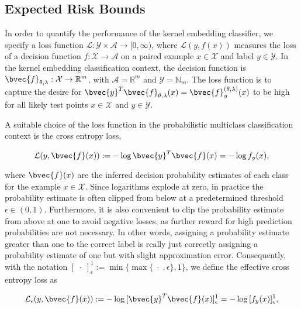 \documentclass{article}
\begin{document}
	\subsection{Expected Risk Bounds}
	\label{app:expected_risk_bounds}
	
		In order to quantify the performance of the kernel embedding classifier, we specify a loss function $\mathcal{L} : \mathcal{Y} \times \mathcal{A} \to [0, \infty)$, where $\mathcal{L}(y, f(x))$ measures the loss of a decision function $f : \mathcal{X} \to \mathcal{A}$ on a paired example $x \in \mathcal{X}$ and label $y \in \mathcal{Y}$. In the kernel embedding classification context, the decision function is $\bvec{f}_{\theta, \lambda} : \mathcal{X} \to \mathbb{R}^{m}$, with $\mathcal{A} = \mathbb{R}^{m}$ and $\mathcal{Y} = \mathbb{N}_{m}$. The loss function is to capture the desire for $\bvec{y}^{T} \bvec{f}_{\theta, \lambda}(x) = \bvec{f}_{y}^{(\theta, \lambda)}(x)$ to be high for all likely test points $x \in \mathcal{X}$ and $y \in \mathcal{Y}$.
		
		A suitable choice of the loss function in the probabilistic multiclass classification context is the cross entropy loss,
		
		\begin{equation}
			\mathcal{L}(y, \bvec{f}(x)) := - \log{\bvec{y}^{T} \bvec{f}(x)} = - \log{f_{y}(x)},
		\end{equation}
		
		where $\bvec{f}(x)$ are the inferred decision probability estimates of each class for the example $x \in \mathcal{X}$. Since logarithms explode at zero, in practice the probability estimate is often clipped from below at a predetermined threshold $\epsilon \in (0, 1)$. Furthermore, it is also convenient to clip the probability estimate from above at one to avoid negative losses, as further reward for high prediction probabilities are not necessary. In other words, assigning a probability estimate greater than one to the correct label is really just correctly assigning a probability estimate of one but with slight approximation error. Consequently, with the notation $[\;\cdot\;]_{\epsilon}^{1} := \min\{\max\{\;\cdot\;, \epsilon\}, 1\}$, we define the effective cross entropy loss as
		
		\begin{equation}
			\mathcal{L}_{\epsilon}(y, \bvec{f}(x)) := - \log{ [\bvec{y}^{T} \bvec{f}(x)]_{\epsilon}^{1} } = - \log{ [f_{y}(x)]_{\epsilon}^{1} },
		\label{eq:cross_entropy_loss}
		\end{equation}
		
\end{document}
